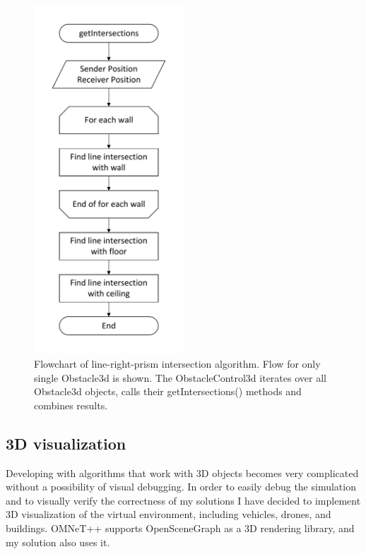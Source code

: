 \documentclass[]{nsm-thesis}
\begin{document}
\begin{figure}
	\centering
	\includegraphics[width=0.5\textwidth]{figures/Obstacle3d-flow.pdf}
	\caption{Flowchart of line-right-prism intersection algorithm. Flow for only single Obstacle3d is shown. The ObstacleControl3d iterates over all Obstacle3d objects, calls their getIntersections() methods and combines results.}
	\label{fig:obstacle3d-flow}
\end{figure}



\subsection{3D visualization}

Developing with algorithms that work with 3D objects becomes very complicated without a possibility of visual debugging. In order to easily debug the simulation and to visually verify the correctness of my solutions I have decided to implement 3D visualization of the virtual environment, including vehicles, drones, and buildings. OMNeT++ supports OpenSceneGraph as a 3D rendering library, and my solution also uses it. 
\end{document}
